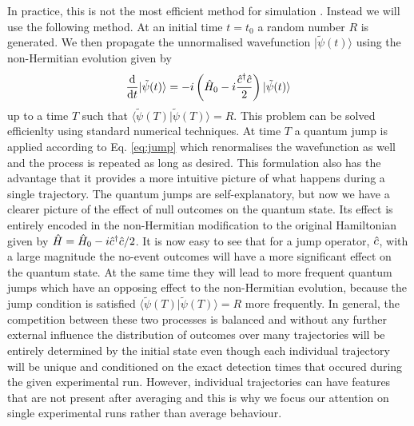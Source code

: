 In practice, this is not the most efficient method for simulation
\cite{MeasurementControl}. Instead we will use the following
method. At an initial time $t = t_0$ a random number $R$ is
generated. We then propagate the unnormalised wavefunction
$| \tilde{\psi} (t) \rangle$ using the non-Hermitian evolution given
by
\begin{equation}
  \frac{\mathrm{d}}{\mathrm{d}t} | \tilde{\psi} (t) \rangle = -i
  \left( \hat{H}_0 - i \frac{\hat{c}^\dagger \hat{c}}{2} \right) | \tilde{\psi} (t) \rangle
\end{equation}
up to a time $T$ such that
$\langle \tilde{\psi} (T) | \tilde{\psi} (T) \rangle = R$. This
problem can be solved efficienlty using standard numerical
techniques. At time $T$ a quantum jump is applied according to
Eq. \eqref{eq:jump} which renormalises the wavefunction as well and
the process is repeated as long as desired. This formulation also has
the advantage that it provides a more intuitive picture of what
happens during a single trajectory. The quantum jumps are
self-explanatory, but now we have a clearer picture of the effect of
null outcomes on the quantum state. Its effect is entirely encoded in
the non-Hermitian modification to the original Hamiltonian given by
$\hat{H} = \hat{H}_0 - i \hat{c}^\dagger \hat{c} / 2$. It is now easy to see that for a
jump operator, $\hat{c}$, with a large magnitude the no-event outcomes will
have a more significant effect on the quantum state. At the same time
they will lead to more frequent quantum jumps which have an opposing
effect to the non-Hermitian evolution, because the jump condition is
satisfied $\langle \tilde{\psi} (T) | \tilde{\psi} (T) \rangle = R$
more frequently. In general, the competition between these two
processes is balanced and without any further external influence the
distribution of outcomes over many trajectories will be entirely
determined by the initial state even though each individual trajectory
will be unique and conditioned on the exact detection times that
occured during the given experimental run. However, individual
trajectories can have features that are not present after averaging
and this is why we focus our attention on single experimental runs
rather than average behaviour.


